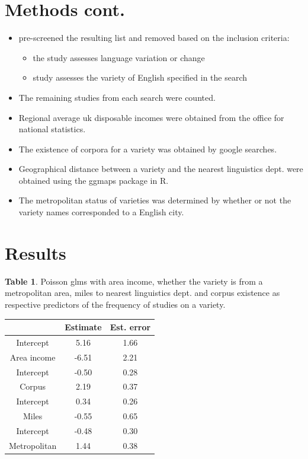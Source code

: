 \documentclass[a0paper,fleqn]{betterposter}
\begin{document}
{
	\section{Methods cont.}	
\begin{itemize}
	\item pre-screened the resulting list and removed based on the inclusion criteria:
	\begin{itemize}
		\item the study assesses language variation or change
		\item study assesses the variety of English specified in the search
	\end{itemize}
	\item The remaining studies from each search were counted.

	\item Regional average uk disposable incomes were obtained from the office for national statistics.
	\item The existence of corpora for a variety was obtained by google searches.
	\item Geographical distance between a variety and the nearest linguistics dept. were obtained using the ggmaps package in R.
	
	\item The metropolitan status of varieties was determined by whether or not the variety names corresponded to a English city.
\end{itemize}



\section{Results}

\vspace{1cm}
\textbf{Table 1}. Poisson glms with area income, whether the variety is from a metropolitan area, miles to nearest linguistics dept. and corpus existence as respective predictors of the frequency of studies on a variety.

\begin{tabular}{ c c c }
	 & Estimate & Est. error\\
	\hline
	 Intercept & 5.16 & 1.66	\\
	 Area income & -6.51 & 2.21\\
	\hline
	 Intercept & -0.50 & 0.28  \\
	 Corpus & 2.19 & 0.37 \\
	\hline
	 Intercept & 0.34  & 0.26  \\
	 Miles & -0.55  & 0.65  \\
	\hline
	 Intercept & -0.48 & 0.30 \\
	 Metropolitan & 1.44 & 0.38  \\
\hline
\end{tabular}



}
\end{document}
